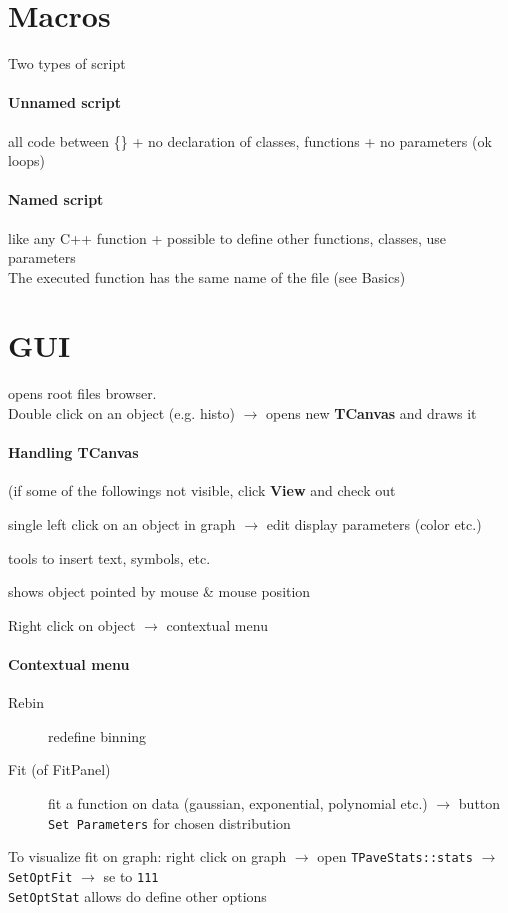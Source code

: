 \documentclass[10pt, oneside]{article}
\begin{document}
\section{Macros}
Two types of script
\paragraph{Unnamed script} all code between \{\} + no declaration of classes, functions + no parameters (ok loops)
\paragraph{Named script} like any C++ function + possible to define other functions, classes, use parameters
\\The executed function has the same name of the file (see Basics)

\section{GUI}
 opens root files browser. 
\\Double click on an object (e.g. histo) $\rightarrow$ opens new \textbf{TCanvas} and draws it
\paragraph{Handling TCanvas}
(if some of the followings not visible, click \textbf{View} and check out
\begin{description}
\item[Editor] single left click on an object in graph $\rightarrow$ edit display parameters (color etc.)
\item[Toolbar] tools to insert text, symbols, etc.
\item[Status bar] shows object pointed by mouse \& mouse position
\item Right click on object $\rightarrow$ contextual menu
\end{description}
\paragraph{Contextual menu}
\begin{description}
\item[Rebin] redefine binning
\item[Fit (of FitPanel)] fit a function on data (gaussian, exponential, polynomial etc.) $\rightarrow$ button \texttt{Set Parameters} for chosen distribution
\end{description}
To visualize fit on graph: right click on graph $\rightarrow$ open \texttt{TPaveStats::stats} $\rightarrow$ \texttt{SetOptFit} $\rightarrow$ se to \texttt{111}
\\\texttt{SetOptStat} allows do define other options
\end{document}
